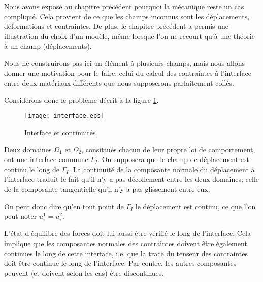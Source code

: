 \medskip
Nous avons exposé au chapitre précédent pourquoi la mécanique reste un cas
compliqué. Cela provient de ce que les champs inconnus sont les déplacements,
déformations et contraintes.
De plus, le chapitre précédent a permis une illustration du choix d'un modèle,
même lorsque l'on ne recourt qu'à une théorie à un champ (déplacements).

\medskip
Nous ne construirons pas ici un élément à plusieurs champs, mais nous
allons donner une motivation pour le faire: celui du calcul des contraintes à
l'interface entre deux matériaux différents que nous supposerons parfaitement
collés.

Considérons donc le problème décrit à la figure \ref{interf}.
\begin{figure}[ht]
\centering
\texttt{[image: interface.eps]}
\caption{\label{interf} Interface et continuités}
\end{figure}
Deux domaines $\Omega_1$ et $\Omega_2$, consittués chacun de leur
propre loi de comportement, ont une interface commune $\Gamma_I$.
On supposera que le champ de déplacement est continu le long de $\Gamma_I$.
La continuité de la composante normale du déplacement à l'interface traduit le
fait qu'il n'y a pas décollement entre les deux domaines; celle de la composante
tangentielle qu'il n'y a pas glissement entre eux.

On peut donc dire qu'en tout point de $\Gamma_I$ le déplacement est
continu, ce que l'on peut noter $u_i^1=u_i^2$.

\medskip
L'état d'équilibre des forces doit lui-aussi être vérifié le long de l'interface.
Cela implique que les composantes normales des contraintes doivent être également
continues le long de cette interface, i.e. que la trace du tenseur des contraintes doit
être continue le long de l'interface.
Par contre, les autres composantes peuvent (et doivent selon les cas) être
discontinues.

